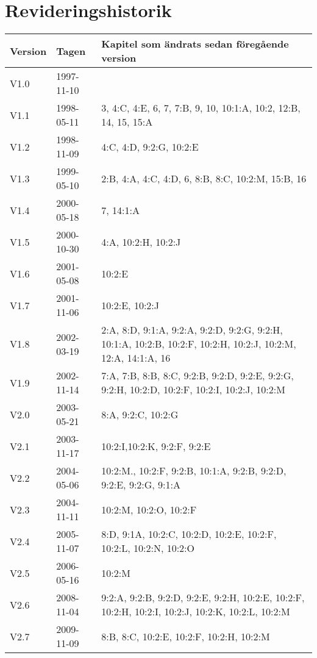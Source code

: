 \documentclass[10pt]{article}
\begin{document}
\section*{Revideringshistorik}
\begin{center}
\begin{tabular}{| l | l | p{10cm} |}
    \hline
    Version & Tagen & Kapitel som ändrats sedan föregående version \\
    \hline
    V1.0 & 1997-11-10 & \\
    \hline
    V1.1 & 1998-05-11 & 3, 4:C, 4:E, 6, 7, 7:B, 9, 10, 10:1:A, 10:2, 12:B,
    14, 15, 15:A \\
    \hline
    V1.2 & 1998-11-09 & 4:C, 4:D, 9:2:G, 10:2:E \\
    \hline
    V1.3 & 1999-05-10 & 2:B, 4:A, 4:C, 4:D, 6, 8:B, 8:C, 10:2:M, 15:B, 16 \\
    \hline
    V1.4 & 2000-05-18 & 7, 14:1:A \\
    \hline
    V1.5 & 2000-10-30 & 4:A, 10:2:H, 10:2:J \\
    \hline
    V1.6 & 2001-05-08 & 10:2:E \\
    \hline
    V1.7 & 2001-11-06 & 10:2:E, 10:2:J \\
    \hline
    V1.8 & 2002-03-19 & 2:A, 8:D, 9:1:A, 9:2:A, 9:2:D, 9:2:G, 9:2:H, 10:1:A,
    10:2:B, 10:2:F, 10:2:H, 10:2:J, 10:2:M, 12:A, 14:1:A, 16 \\
    \hline
    V1.9 & 2002-11-14 & 7:A, 7:B, 8:B, 8:C, 9:2:B, 9:2:D, 9:2:E, 9:2:G,
    9:2:H, 10:2:D, 10:2:F, 10:2:I, 10:2:J, 10:2:M \\
    \hline
    V2.0 & 2003-05-21 & 8:A, 9:2:C, 10:2:G \\
    \hline
    V2.1 & 2003-11-17 & 10:2:I,10:2:K, 9:2:F, 9:2:E \\
    \hline
    V2.2 & 2004-05-06 & 10:2:M., 10:2:F, 9:2:B, 10:1:A, 9:2:B, 9:2:D, 9:2:E,
    9:2:G, 9:1:A \\
    \hline
    V2.3 & 2004-11-11 & 10:2:M, 10:2:O, 10:2:F \\
    \hline
    V2.4 & 2005-11-07 & 8:D, 9:1A, 10:2:C, 10:2:D, 10:2:E, 10:2:F, 10:2:L,
    10:2:N, 10:2:O \\
    \hline
    V2.5 & 2006-05-16 & 10:2:M \\
    \hline
    V2.6 & 2008-11-04 & 9:2:A, 9:2:B, 9:2:D, 9:2:E, 9:2:H, 10:2:E, 10:2:F,
    10:2:H, 10:2:I, 10:2:J, 10:2:K, 10:2:L, 10:2:M \\
    \hline
    V2.7 & 2009-11-09 &  8:B, 8:C, 10:2:E, 10:2:F, 10:2:H, 10:2:M\\

\end{tabular}
\end{center}
\end{document}

